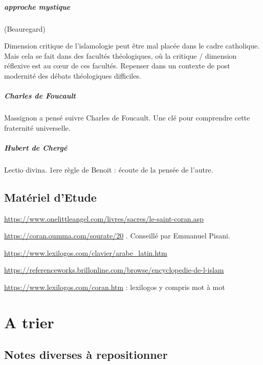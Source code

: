 \paragraph{approche mystique} (Beauregard)



Dimension critique de l’islamologie peut être mal placée dans le cadre catholique. Mais cela se fait dans des facultés théologiques, où la critique / dimension réflexive est au cœur de ces facultés. Repenser dans un contexte de post modernité des débats théologiques difficiles.


\paragraph{Charles de Foucault}
Massignon a pensé suivre Charles de Foucault. Une clé pour comprendre cette fraternité universelle. 

\paragraph{Hubert de Chergé}
Lectio divina. 1ere règle de Benoit : écoute de la pensée de l’autre. 

\stopcontents[mainsections]
\section{Matériel d'Etude}\label{matuxe9riel}

\url{https://www.onelittleangel.com/livres/sacres/le-saint-coran.asp}

\url{https://coran.oumma.com/sourate/20} . Conseillé par Emmanuel
Pisani.

\url{https://www.lexilogos.com/clavier/arabe_latin.htm}

\url{https://referenceworks.brillonline.com/browse/encyclopedie-de-l-islam}

\url{https://www.lexilogos.com/coran.htm} : lexilogos y compris mot à
mot



\chapter{A trier}


\section{Notes diverses à repositionner}







